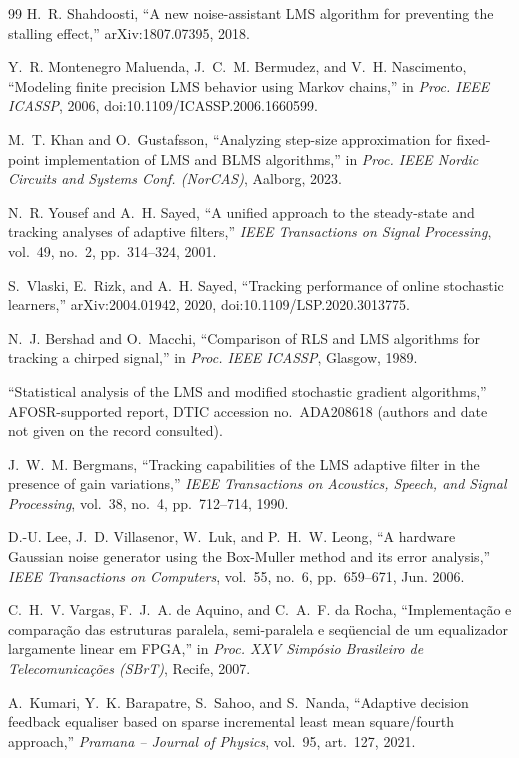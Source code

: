 {\begin{thebibliography}{99}
 H.~R. Shahdoosti, ``A new noise-assistant LMS algorithm for preventing the stalling effect,'' arXiv:1807.07395, 2018.

 Y.~R. Montenegro Maluenda, J.~C.~M. Bermudez, and V.~H. Nascimento, ``Modeling finite precision LMS behavior using Markov chains,'' in \emph{Proc. IEEE ICASSP}, 2006, doi:10.1109/ICASSP.2006.1660599.

 M.~T. Khan and O.~Gustafsson, ``Analyzing step-size approximation for fixed-point implementation of LMS and BLMS algorithms,'' in \emph{Proc. IEEE Nordic Circuits and Systems Conf. (NorCAS)}, Aalborg, 2023.

 N.~R. Yousef and A.~H. Sayed, ``A unified approach to the steady-state and tracking analyses of adaptive filters,'' \emph{IEEE Transactions on Signal Processing}, vol.~49, no.~2, pp.~314--324, 2001.

 S.~Vlaski, E.~Rizk, and A.~H. Sayed, ``Tracking performance of online stochastic learners,'' arXiv:2004.01942, 2020, doi:10.1109/LSP.2020.3013775.

 N.~J. Bershad and O.~Macchi, ``Comparison of RLS and LMS algorithms for tracking a chirped signal,'' in \emph{Proc. IEEE ICASSP}, Glasgow, 1989.

 ``Statistical analysis of the LMS and modified stochastic gradient algorithms,'' AFOSR-supported report, DTIC accession no.\ ADA208618 (authors and date not given on the record consulted).

 J.~W.~M. Bergmans, ``Tracking capabilities of the LMS adaptive filter in the presence of gain variations,'' \emph{IEEE Transactions on Acoustics, Speech, and Signal Processing}, vol.~38, no.~4, pp.~712--714, 1990.

 D.-U. Lee, J.~D. Villasenor, W.~Luk, and P.~H.~W. Leong, ``A hardware Gaussian noise generator using the Box-Muller method and its error analysis,'' \emph{IEEE Transactions on Computers}, vol.~55, no.~6, pp.~659--671, Jun. 2006.

 C.~H.~V. Vargas, F.~J.~A. de Aquino, and C.~A.~F. da Rocha, ``Implementa\c{c}\~ao e compara\c{c}\~ao das estruturas paralela, semi-paralela e seq\"uencial de um equalizador largamente linear em FPGA,'' in \emph{Proc. XXV Simp\'osio Brasileiro de Telecomunica\c{c}\~oes (SBrT)}, Recife, 2007.

 A.~Kumari, Y.~K. Barapatre, S.~Sahoo, and S.~Nanda, ``Adaptive decision feedback equaliser based on sparse incremental least mean square/fourth approach,'' \emph{Pramana -- Journal of Physics}, vol.~95, art.~127, 2021.


\end{thebibliography}}
